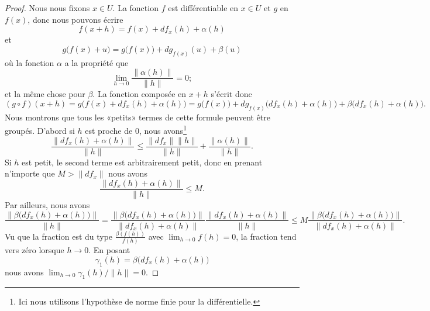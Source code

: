 \begin{proof}
	Nous nous fixons \( x\in U\). La fonction \( f\) est différentiable en \( x\in U\) et \( g\) en \( f(x)\), donc nous pouvons écrire
	\begin{equation}
		f(x+h)=f(x)+df_x(h)+\alpha(h)
	\end{equation}
	et
	\begin{equation}
		g\big( f(x)+u \big)=g\big( f(x) \big)+dg_{f(x)}(u)+\beta(u)
	\end{equation}
	où la fonction \( \alpha\) a la propriété que
	\begin{equation}
		\lim_{h\to 0} \frac{ \| \alpha(h) \| }{ \| h \| }=0;
	\end{equation}
	et la même chose pour \( \beta\). La fonction composée en \( x+h\) s'écrit donc
	\begin{equation}    \label{EqCXcfhfH}
		(g\circ f)(x+h)=g\big( f(x)+df_x(h)+\alpha(h) \big)=g\big( f(x) \big)+dg_{f(x)}\big( df_x(h)+\alpha(h) \big)+\beta\big( df_x(h)+\alpha(h) \big).
	\end{equation}
	Nous montrons que tous les «petits» termes de cette formule peuvent être groupés. D'abord si \( h\) est proche de \( 0\), nous avons\footnote{Ici nous utilisons l'hypothèse de norme finie pour la différentielle.}
	\begin{equation}
		\frac{ \| df_x(h)+\alpha(h) \| }{ \| h \| }\leq\frac{ \| df_x \|\| h \| }{ \| h \| }+\frac{ \| \alpha(h) \| }{ \| h \| }.
	\end{equation}
	Si \( h\) est petit, le second terme est arbitrairement petit, donc en prenant n'importe que \( M>\| df_x \|\) nous avons
	\begin{equation}
		\frac{ \| df_x(h)+\alpha(h) \| }{ \| h \| }\leq M.
	\end{equation}
	Par ailleurs, nous avons
	\begin{equation}
		\frac{ \| \beta\big( df_x(h)+\alpha(h) \big) \| }{ \| h \| }=\frac{  \| \beta\big( df_x(h)+\alpha(h) \big) \|  }{ \| df_x(h)+\alpha(h) \| }\frac{  \| df_x(h)+\alpha(h) \|  }{ \| h \| }\leq M\frac{  \| \beta\big( df_x(h)+\alpha(h) \big) \|  }{   \| df_x(h)+\alpha(h) \| }.
	\end{equation}
	Vu que la fraction est du type \( \frac{ \beta( f(h)) }{ f(h) }\) avec \( \lim_{h\to 0} f(h)=0\), la fraction tend vers zéro lorsque \( h\to 0\). En posant
	\begin{equation}
		\gamma_1(h)=\beta\big( df_x(h)+\alpha(h) \big)
	\end{equation}
	nous avons \( \lim_{h\to 0} \gamma_1(h)/\| h \|=0\).


\end{proof}
